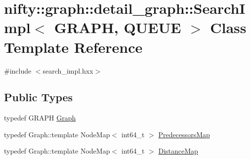 \hypertarget{classnifty_1_1graph_1_1detail__graph_1_1SearchImpl}{}\section{nifty\+:\+:graph\+:\+:detail\+\_\+graph\+:\+:Search\+Impl$<$ G\+R\+A\+P\+H, Q\+U\+E\+U\+E $>$ Class Template Reference}
\label{classnifty_1_1graph_1_1detail__graph_1_1SearchImpl}


{\ttfamily \#include $<$search\+\_\+impl.\+hxx$>$}

\subsection*{Public Types}
\begin{DoxyCompactItemize}
\item 
typedef G\+R\+A\+P\+H \hyperlink{classnifty_1_1graph_1_1detail__graph_1_1SearchImpl_a8426363c518ca7ef2383b5cb1f06713d}{Graph}
\item 
typedef Graph\+::template Node\+Map$<$ int64\+\_\+t $>$ \hyperlink{classnifty_1_1graph_1_1detail__graph_1_1SearchImpl_ae495d858111c13b737fe264a12a273c8}{Predecessors\+Map}
\item 
typedef Graph\+::template Node\+Map$<$ int64\+\_\+t $>$ \hyperlink{classnifty_1_1graph_1_1detail__graph_1_1SearchImpl_abbd31f7e73ba6851a8f955cd64d59917}{Distance\+Map}
\end{DoxyCompactItemize}

